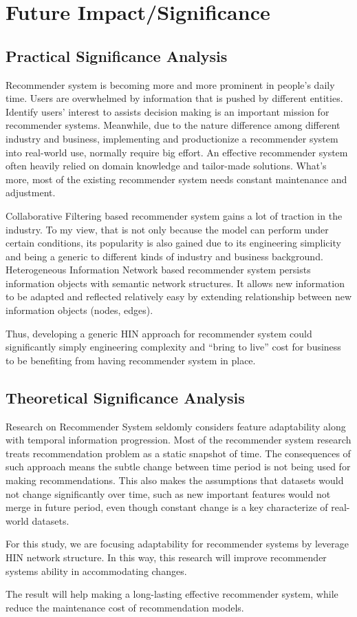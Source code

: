 \section{Future Impact/Significance}

\subsection{Practical Significance Analysis}
Recommender system is becoming more and more prominent in people's daily time. Users are overwhelmed by information that is pushed by different entities. Identify users' interest to assists decision making is an important mission for recommender systems. Meanwhile, due to the nature difference among different industry and business, implementing and productionize a recommender system into real-world use, normally require big effort. An effective recommender system often heavily relied on domain knowledge and tailor-made solutions. What's more, most of the existing recommender system needs constant maintenance and adjustment.  

Collaborative Filtering based recommender system gains a lot of traction in the industry. To my view, that is not only because the model can perform under certain conditions, its popularity is also gained due to its engineering simplicity and being a generic to different kinds of industry and business background. Heterogeneous Information Network based recommender system persists information objects with semantic network structures. It allows new information to be adapted and reflected relatively easy by extending relationship between new information objects (nodes, edges).  

Thus, developing a generic HIN approach for recommender system could significantly simply engineering complexity and “bring to live” cost for business to be benefiting from having recommender system in place. 

\subsection{Theoretical Significance Analysis}
Research on Recommender System seldomly considers feature adaptability along with temporal information progression. Most of the recommender system research treats recommendation problem as a static snapshot of time. The consequences of such approach means the subtle change between time period is not being used for making recommendations. This also makes the assumptions that datasets would not change significantly over time, such as new important features would not merge in future period, even though constant change is a key characterize of real-world datasets. 

For this study, we are focusing adaptability for recommender systems by leverage HIN network structure.  In this way, this research will improve recommender systems ability in accommodating changes. 

The result will help making a long-lasting effective recommender system, while reduce the maintenance cost of recommendation models. 


